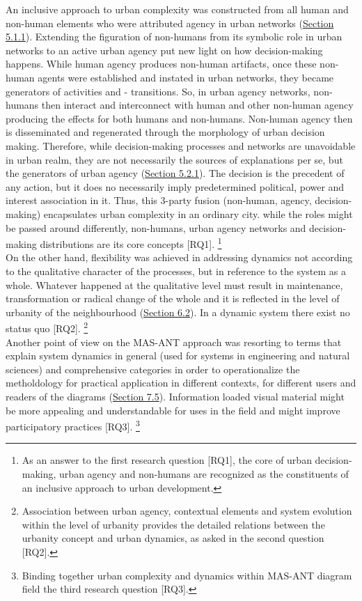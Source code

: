 \documentclass[11pt]{report}
\begin{document}
{An inclusive approach to urban complexity was constructed from all human and non-human elements who were attributed agency in urban networks (\href{Section 5.1.1}{Section 5.1.1}).
Extending the figuration of non-humans from its symbolic role in urban networks to an active urban agency put new light on how decision-making happens.
While human agency produces non-human artifacts, once these non-human agents were established and instated in urban networks, they became generators of activities and - transitions. 
So, in urban agency networks, non-humans then interact and interconnect with human and other non-human agency producing the effects for both humans and non-humans.
Non-human agency then is disseminated and regenerated through the morphology of urban decision making.
Therefore, while decision-making processes and networks are unavoidable in urban realm, they are not necessarily the sources of explanations per se, but the generators of urban agency (\href{Section 5.2.1}{Section 5.2.1}). The decision is the precedent of any action, but it does no necessarily imply predetermined political, power and interest association in it. 
Thus, this 3-party fusion (non-human, agency, decision-making) encapsulates urban complexity in an ordinary city. while the roles might be passed around differently, non-humans, urban agency networks and decision-making distributions are its core concepts [RQ1].
\footnote{As an answer to the first research question [RQ1], the core of urban decision-making, urban agency and non-humans are recognized as the constituents of an inclusive approach to urban development.}
\\

On the other hand, flexibility was achieved in addressing dynamics not according to the qualitative character of the processes, but in reference to the system as a whole. Whatever happened at the qualitative level must result in maintenance, transformation or radical change of the whole and it is reflected in the level of urbanity of the neighbourhood (\href{Section 6.2}{Section 6.2}). In a dynamic system there exist no status quo [RQ2].
\footnote{Association between urban agency, contextual elements and system evolution within the level of urbanity provides the detailed relations between the urbanity concept and urban dynamics, as asked in the second question [RQ2].}
\\

Another point of view on the MAS-ANT approach was resorting to terms that explain system dynamics in general (used for systems in engineering and natural sciences) and comprehensive categories in order to operationalize the metholdology for practical application in different contexts, for different users and readers of the diagrams (\href{Section 7.5}{Section 7.5}).
Information loaded visual material might be more appealing and understandable for uses in the field and might improve participatory practices [RQ3].
\footnote{Binding together urban complexity and dynamics within MAS-ANT diagram field the third research question [RQ3].}

}
\end{document}
